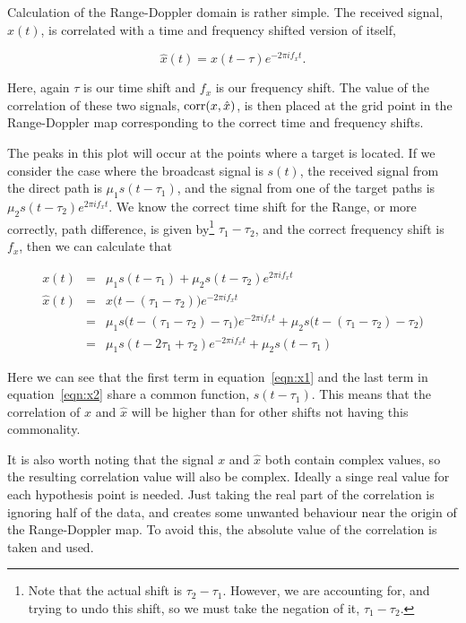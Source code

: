 \documentclass[12pt,openany,a4paper]{book}
\begin{document}
\bigskip

Calculation of the Range-Doppler domain is rather simple. The received signal, $x(t)$, is correlated with a time and frequency shifted version of itself,

\begin{equation}
\hat{x}(t) = x(t-\tau) e^{ -2\pi i f_x t}.
\end{equation}

\bigskip

Here, again $\tau$ is our time shift and $f_x$ is our frequency shift. The value of the correlation of these two signals, $\textnormal{corr}(x,\hat{x})$, is then placed at the grid point in the Range-Doppler map corresponding to the correct time and frequency shifts.

\bigskip

The peaks in this plot will occur at the points where a target is located.
If we consider the case where the broadcast signal is $s(t)$, the received signal from the direct path is $\mu_1s(t-\tau_1)$, and the signal from one of the target paths is $\mu_2s(t-\tau_2)e^{2\pi i f_x t}$. We know the correct time shift for the Range, or more correctly, path difference, is given by\footnote{Note that the actual shift is $\tau_2 - \tau_1$. However, we are accounting for, and trying to undo this shift, so we must take the negation of it, $\tau_1 - \tau_2$.} $\tau_1 - \tau_2$, and the correct frequency shift is $f_x$, then we can calculate that

\begin{eqnarray}
\label{eqn:x1}
x(t) & = & \mu_1s(t-\tau_1) + \mu_2s(t-\tau_2)e^{2\pi i f_x t} \\
\hat{x}(t) & = & x\bigg(t-(\tau_1 - \tau_2)\bigg) e^{ -2\pi i f_x t} \\
 & = & \mu_1s\bigg(t-(\tau_1 - \tau_2)-\tau_1\bigg)e^{ -2\pi i f_x t}	 + \mu_2s\bigg(t-(\tau_1 - \tau_2)-\tau_2\bigg) \\
 \label{eqn:x2}
  & = & \mu_1s(t-2\tau_1 + \tau_2)e^{ -2\pi i f_x t} + \mu_2s(t-\tau_1)
\end{eqnarray}

\bigskip

Here we can see that the first term in equation~\ref{eqn:x1} and the last term in equation~\ref{eqn:x2} share a common function, $s(t-\tau_1)$. This means that the correlation of $x$ and $\hat{x}$ will be higher than for other shifts not having this commonality.

\bigskip

It is also worth noting that the signal $x$ and $\hat{x}$ both contain complex values, so the resulting correlation value will also be complex. Ideally a singe real value for each hypothesis point is needed. Just taking the real part of the correlation is ignoring half of the data, and creates some unwanted behaviour near the origin of the Range-Doppler map. To avoid this, the absolute value of the correlation is taken and used.
\end{document}
